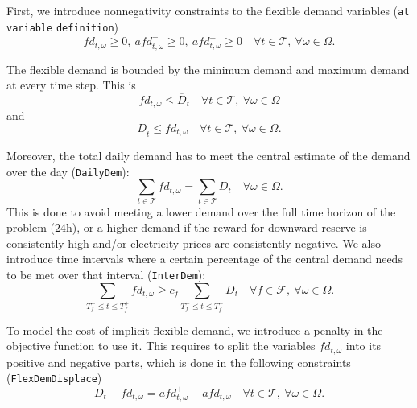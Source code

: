 \documentclass{article}
\begin{document}
\newline
First, we introduce nonnegativity constraints to the flexible demand variables (\verb|at variable| \verb|definition|)
\begin{equation} \label{EQ:FlexDemandPos}
	fd_{t, \omega} \geq 0, \ afd_{t, \omega}^+ \geq 0, \ afd_{t, \omega}^- \geq 0 \quad \forall t \in \mathcal{T}, \ \forall \omega \in \Omega.
\end{equation}

The flexible demand is bounded by the minimum demand and maximum demand at every time step. This is
\begin{equation} \label{EQ:FlexDemand_UB_preliminary}
	fd_{t, \omega} \leq \overline{D}_t \quad \forall t \in \mathcal{T}, \ \forall \omega \in \Omega
\end{equation}
and 
\begin{equation} \label{EQ:FlexDemand_LB_preliminary}
	\underline{D}_t \leq fd_{t, \omega} \quad \forall t \in \mathcal{T}, \ \forall \omega \in \Omega.
\end{equation}

Moreover, the total daily demand has to meet the central estimate of the demand over the day (\verb|DailyDem|): 
\begin{equation} \label{EQ:DailyDem}
	\sum_{t \in \mathcal{T}} fd_{t, \omega} = \sum_{t \in \mathcal{T}} D_t \quad \forall \omega \in \Omega.
\end{equation}
This is done to avoid meeting a lower demand over the full time horizon of the problem ($24$h), or a higher demand if the reward for downward reserve is consistently high and/or electricity prices are consistently negative. We also introduce time intervals where a certain percentage of the central demand needs to be met over that interval (\verb|InterDem|):
\begin{equation} \label{EQ:InterDem}
	\sum_{T_f^- \leq t \leq T_f^+} fd_{t, \omega} \geq c_f \sum_{T_f^- \leq t \leq T_f^+} D_t \quad \forall f \in \mathcal{F}, \ \forall \omega \in \Omega.
\end{equation}

To model the cost of implicit flexible demand, we introduce a penalty in the objective function to use it. This requires to split the variables $fd_{t, \omega}$ into its positive and negative parts, which is done in the following constraints (\verb|FlexDemDisplace|)
\begin{equation} \label{EQ:FlexDemDisplace}
	D_t - fd_{t, \omega} = afd_{t, \omega}^+ - afd_{t, \omega}^- \quad \forall t \in \mathcal{T}, \ \forall \omega \in \Omega.
\end{equation}
\end{document}
